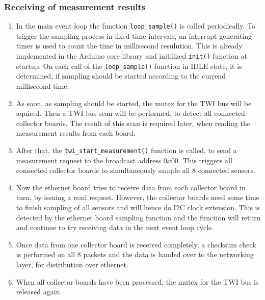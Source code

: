 \documentclass[a4paper]{scrreprt}
\begin{document}
\subsubsection{Receiving of measurement results}
\begin{enumerate}
  \item In the main event loop the function \texttt{loop\_sample()} is called periodically. To trigger the sampling process in fixed time
    intervals, an interrupt generating timer is used to count the time in millisecond resulution. This is already implemented in the Arduino core library
    and initilized \texttt{init()} function at startup.
    On each call of the \texttt{loop\_sample()} function in IDLE state, it is determined, if sampling should be started according to the
    currend millisecond time.
  \item As soon, as sampling should be started, the mutex for the TWI bus will be aquired. Then a TWI bus scan will be performed, to detect
    all connected collector boards. The result of this scan is required later, when reading the measurement results from each board.
  \item After that, the \texttt{twi\_start\_measurement()} function is called, to send a measurement request to the broadcast address $0x00$.
    This triggers all connected collector
    boards to simultaneously sample all 8 connected sensors.
  \item Now the ethernet board tries to receive data from each collector board in turn, by issuing a read request. However, the collector boards
    need some time to finish sampling of all sensors and will hence do I2C clock extension. This is detected by the ethernet board
    sampling function and the function will return and continue to try receiving data in the next event loop cycle.
  \item Once data from one collector board is received completely, a checksum check is performed on all 8 packets and the data is
    handed over to the networking layer, for distribution over ethernet.
  \item When all collector boards have been processed, the mutex for the TWI bus is released again.
\end{enumerate}
\end{document}
